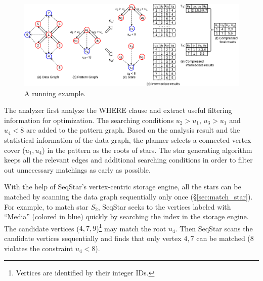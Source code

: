 \begin{figure}[ht]
  \centering
  \includegraphics[width=\textwidth]{img/running_example.pdf}
  \caption{A running example.}\label{img:running_example}
\end{figure}

The analyzer first analyze the WHERE clause and extract useful filtering information for optimization.
The searching conditions $u_2> u_1$, $u_3 > u_1$ and $u_4 < 8$ are added to the pattern graph.
Based on the analysis result and the statistical information of the data graph,
the planner selects a connected vertex cover ($u_1, u_4$) in the pattern as the roots of stars.
The star generating algorithm keeps all the relevant edges and additional searching conditions in order to filter out unnecessary matchings as early as possible.

With the help of SeqStar's vertex-centric storage engine,
all the stars can be matched by scanning the data graph sequentially only once (\S\ref{sec:match_star}).
For example, to match star $S_2$,
SeqStar seeks to the vertices labeled with ``Media'' (colored in blue) quickly by searching the index in the storage engine.
The candidate vertices ($4, 7, 9$)\footnote{Vertices are identified by their integer IDs.} may match the root $u_4$.
Then SeqStar scans the candidate vertices sequentially and finds that only vertex $4, 7$ can be matched ($8$ violates the constraint $u_4 < 8$).

